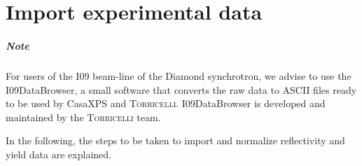 \documentclass[oldfontcommands,openany,oneside]{memoir}
\begin{document}
\chapter{Import experimental data} \label{chap:Import}
\paragraph{Note} For users of the I09 beam-line of the Diamond synchrotron, we advise to use the I09DataBrowser, a small software that converts the raw data to ASCII files ready to be used by CasaXPS and \textsc{Torricelli}. I09DataBrowser is developed and maintained by the \textsc{Torricelli} team.

In the following, the steps to be taken to import and normalize reflectivity and yield data are explained.
\end{document}
